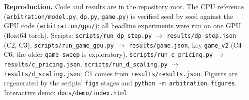 \documentclass[10pt]{article}
\begin{document}
\textbf{Reproduction.} Code and results are in the repository root. The CPU reference (\texttt{arbitration/model.py}, \texttt{dp.py}, \texttt{game.py}) is verified seed by seed against the GPU code (\texttt{arbitration/gpu/}); all headline experiments were run on one GPU (float64 torch). Scripts: \texttt{scripts/run\_dp\_step.py} $\to$ \texttt{results/dp\_step.json} (C2, C3), \texttt{scripts/run\_game\_gpu.py} $\to$ \texttt{results/game.json}, key \texttt{game\_v2} (C4--C6; the older \texttt{game\_sweep} is exploratory), \texttt{scripts/run\_c\_pricing.py} $\to$ \texttt{results/c\_pricing.json}, \texttt{scripts/run\_d\_scaling.py} $\to$ \texttt{results/d\_scaling.json}; C1 comes from \texttt{results/results.json}. Figures are regenerated by the scripts' \texttt{figs} stages and \texttt{python -m arbitration.figures}. Interactive demo: \texttt{docs/demo/index.html}.



\end{document}

